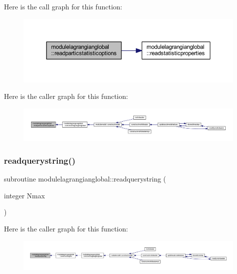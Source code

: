 Here is the call graph for this function\+:\nopagebreak
\begin{figure}[H]
\begin{center}
\leavevmode
\includegraphics[width=350pt]{namespacemodulelagrangianglobal_a8e12f5629f87247807ce50e9527b9fdd_cgraph}
\end{center}
\end{figure}
Here is the caller graph for this function\+:\nopagebreak
\begin{figure}[H]
\begin{center}
\leavevmode
\includegraphics[width=350pt]{namespacemodulelagrangianglobal_a8e12f5629f87247807ce50e9527b9fdd_icgraph}
\end{center}
\end{figure}
\mbox{\label{namespacemodulelagrangianglobal_abfdcea7a4323d6b93cc8c43b343ec0b3}} 
\subsubsection{\texorpdfstring{readquerystring()}{readquerystring()}}
{\footnotesize\ttfamily subroutine modulelagrangianglobal\+::readquerystring (\begin{DoxyParamCaption}\item[{integer}]{Nmax }\end{DoxyParamCaption})\hspace{0.3cm}{\ttfamily [private]}}

Here is the caller graph for this function\+:\nopagebreak
\begin{figure}[H]
\begin{center}
\leavevmode
\includegraphics[width=350pt]{namespacemodulelagrangianglobal_abfdcea7a4323d6b93cc8c43b343ec0b3_icgraph}
\end{center}
\end{figure}
\mbox{\label{namespacemodulelagrangianglobal_aead4b53bdd55ea198839d3d5eda5c768}} 
